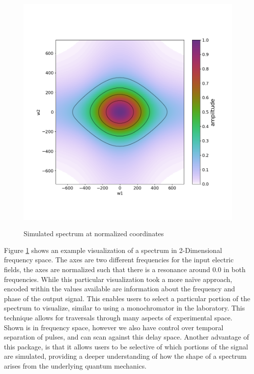 \documentclass[fontsize=11pt]{scrartcl}
\numberwithin{equation}{section}		%
\numberwithin{figure}{section}			%
\numberwithin{table}{section}				%
\begin{document}
\begin{figure}[!htb]
	\centering
	\includegraphics[scale=0.5]{"example_spectrum"}
	\label{fig:example_spectrum}
	\caption{Simulated spectrum at normalized coordinates}
\end{figure}

Figure \ref{fig:example_spectrum} shows an example visualization of a spectrum in 2-Dimensional frequency space.
The axes are two different frequencies for the input electric fields, the axes are normalized such that there is a resonance around $0.0$ in both frequencies.
While this particular visualization took a more na{\"i}ve approach, encoded within the values available are information about the frequency and phase of the output signal.
This enables users to select a particular portion of the spectrum to visualize, similar to using a monochromator in the laboratory.
This technique allows for traversals through many aspects of experimental space.
Shown is in frequency space, however we also have control over temporal separation of pulses, and can scan against this delay space.
Another advantage of this package, is that it allows users to be selective of which portions of the signal are simulated, providing a deeper understanding of how the shape of a spectrum arises from the underlying quantum mechanics.
\end{document}
